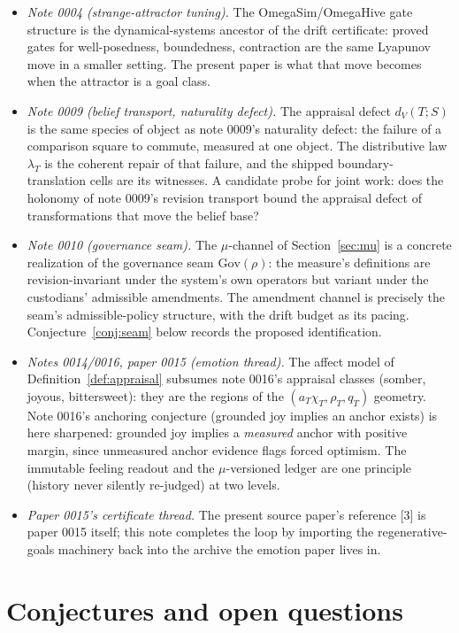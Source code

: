 \documentclass[11pt]{article}
\begin{document}
\begin{itemize}
\item \emph{Note 0004 (strange-attractor tuning).} The OmegaSim/OmegaHive gate
structure is the dynamical-systems ancestor of the drift certificate: proved gates for
well-posedness, boundedness, contraction are the same Lyapunov move in a smaller
setting. The present paper is what that move becomes when the attractor is a goal class.
\item \emph{Note 0009 (belief transport, naturality defect).} The appraisal defect
$d_V(T; S)$ is the same species of object as note 0009's naturality defect: the failure
of a comparison square to commute, measured at one object. The distributive law
$\lambda_T$ is the coherent repair of that failure, and the shipped boundary-translation
cells are its witnesses. A candidate probe for joint work: does the holonomy of note
0009's revision transport bound the appraisal defect of transformations that move the
belief base?
\item \emph{Note 0010 (governance seam).} The $\mu$-channel of
Section~\ref{sec:mu} is a concrete realization of the governance seam
$\mathrm{Gov}(\rho)$: the measure's definitions are revision-invariant under the
system's own operators but variant under the custodians' admissible amendments. The
amendment channel is precisely the seam's admissible-policy structure, with the drift
budget as its pacing. Conjecture~\ref{conj:seam} below records the proposed
identification.
\item \emph{Notes 0014/0016, paper 0015 (emotion thread).} The affect model of
Definition~\ref{def:appraisal} subsumes note 0016's appraisal classes (somber, joyous,
bittersweet): they are the regions of the $(a_T\chi_T, \rho_T, q_T)$ geometry. Note
0016's anchoring conjecture (grounded joy implies an anchor exists) is here sharpened:
grounded joy implies a \emph{measured} anchor with positive margin, since unmeasured
anchor evidence flags forced optimism. The immutable feeling readout and the
$\mu$-versioned ledger are one principle (history never silently re-judged) at two
levels.
\item \emph{Paper 0015's certificate thread.} The present source paper's reference [3]
is paper 0015 itself; this note completes the loop by importing the regenerative-goals
machinery back into the archive the emotion paper lives in.
\end{itemize}

\section{Conjectures and open questions}
\label{sec:open}
\end{document}
